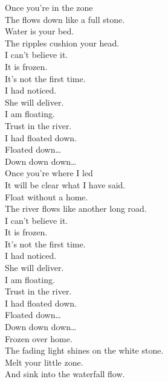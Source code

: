 
\label{album:quarters}




Once you're in the zone \\
The  flows down like a full stone. \\
Water is your bed. \\
The ripples cushion your head. \\

I can't believe it. \\
It is frozen. \\
It's not the first time. \\
I had noticed. \\
She will deliver. \\
I am floating. \\
Trust in the river. \\
I had floated down. \\

Floated down… \\
Down down down… \\

Once you're where I led \\
It will be clear what I have said. \\
Float without a home. \\
The river flows like another long road. \\

I can't believe it. \\
It is frozen. \\
It's not the first time. \\
I had noticed. \\
She will deliver. \\
I am floating. \\
Trust in the river. \\
I had floated down. \\

Floated down… \\
Down down down… \\

Frozen over home. \\
The fading light shines on the white stone. \\
Melt your little zone. \\
And sink into the waterfall flow. \\

